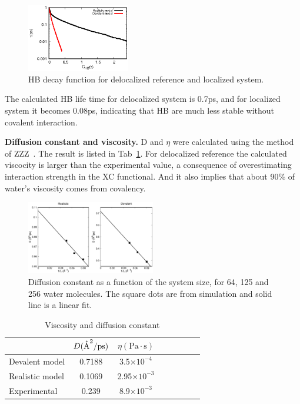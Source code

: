 \documentclass[aps,prl,reprint,amsmath,amssymb]{revtex4-1}
\begin{document}
\begin{figure}
\includegraphics[width=0.4\textwidth]{new_hbdecay}
\caption{HB decay function for delocalized reference and localized system.} \label{Fig:HBdecay}
\end{figure}

The calculated HB life time for delocalized system is 0.7ps, and for localized system it becomes 0.08ps, indicating that HB are much less stable without covalent interaction.
 
 
\textbf{Diffusion constant and viscosity.} D and $\eta$ were calculated using the method of ZZZ~\cite{dunweg1993molecular}. 
The result is listed in Tab~\ref{Tab:dfs}. 
For delocalized reference the calculated viscocity is larger than the experimental value, a consequence of overestimating interaction strength in the XC functional. 
And it also implies that about 90\% of water's viscosity comes from covalency.

\begin{figure}
\includegraphics[width=0.5\textwidth]{msd}
\caption{Diffusion constant as a function of the system size, for 64, 125 and 256 water molecules. 
The square dots are from simulation and solid line is a linear fit.}\label{Fig:dfs}
\end{figure} 

\begin{table}
\caption{Viscosity and diffusion constant}\label{Tab:dfs}
\begin{tabular}{l*{6}{c}r}
\hline
               & $D(\mathring{\text{A}}^2/\text{ps})$ & $\eta(\text{Pa}\cdot \text{s})$ \\
\hline
Devalent model                & 0.7188 & 3.5$\times 10^{-4}$ \\

Realistic model              & 0.1069 & 2.95$\times 10^{-3}$\\

Experimental            & 0.239  & 8.9$\times 10^{-3} $
\end{tabular}
\end{table}
 
\end{document}
